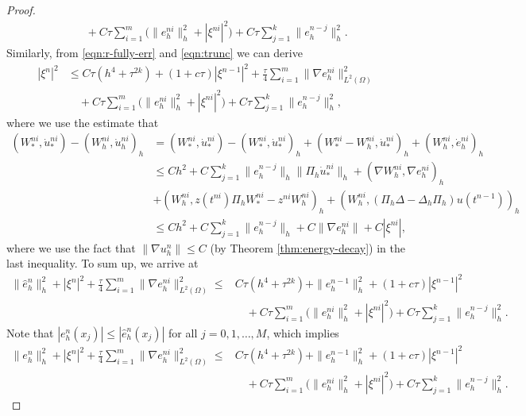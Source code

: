 \documentclass[a4paper, oneside]{book}
\def\II{(\Omega)}
\begin{document}
\begin{proof}
\begin{equation}
\begin{split}
&\quad + C \tau   \sum_{i=1}^m \Big(\|  e_h^{ni} \|_h^2+ |\xi^{ni}|^2 \Big)
+ C\tau  \sum_{j=1}^{k} \|  e_h^{n-j} \|_h^2.
\end{split}
\end{equation}
Similarly, from \eqref{eqn:r-fully-err} and \eqref{eqn:trunc} we can derive
\begin{equation*}
\begin{split}
|\xi^n|^2 &\le C\tau(h^4+ \tau^{2k}) + (1+c \tau) |\xi^{n-1}|^2 + \frac \tau4 \sum_{i=1}^m \| \nabla e_h^{ni} \|_{L^2\II}^2 \\
&\quad + C \tau   \sum_{i=1}^m \Big(\|  e_h^{ni} \|_h^2+ |\xi^{ni}|^2 \Big)
+ C\tau  \sum_{j=1}^{k} \|  e_h^{n-j} \|_h^2,
\end{split}
\end{equation*}
where we use the estimate that
\begin{align*}
  (W_*^{ni} ,   \dot u_*^{ni}) -  (W_h^{ni} ,   \dot u_h^{ni})_h &=  (W_*^{ni} ,   \dot u_*^{ni})  -  (W_*^{ni} ,   \dot u_*^{ni}) _h
   + (W_*^{ni}-W_h^{ni},  \dot u_*^{ni})_h + (W_h^{ni},  \dot e_h^{ni} )_h \\
  & \le C h^{2} + C\sum_{j=1}^k \|  e_h^{n-j} \|_h \|  \Pi_h \dot u_*^{ni} \|_h + (\nabla W_h^{ni},  \nabla  e_h^{ni} )_h\\
 &+ ( W_h^{ni}, z(t^{ni}) \Pi_h W_*^{ni} - z^{ni} W_h^{ni} )_h
  +  ( W_h^{ni}, (\Pi_h \Delta - \Delta_h \Pi_h) u(t^{n-1}) )_h \\
 & \le C h^{2} + C\sum_{j=1}^k \|  e_h^{n-j} \|_h + C \| \nabla  e_h^{ni} \|  + C|\xi^{ni}|,
\end{align*}
where we use the fact that $ \| \nabla u_h^{n} \|\le C$ (by Theorem \ref{thm:energy-decay}) in the last inequality. To sum up, we arrive at
\begin{equation*}
\begin{split}
 \|\hat e_h^{n}\|_h^2 + |\xi^n|^2 + \frac\tau4 \sum_{i=1}^m \| \nabla e_h^{ni} \|_{L^2\II}^2
 \le&  C\tau(h^4+ \tau^{2k}) +  \|e_h^{n-1}\|_h^2 + (1+c \tau) |\xi^{n-1}|^2   \\
&\quad + C \tau   \sum_{i=1}^m \Big(\|  e_h^{ni} \|_h^2+ |\xi^{ni}|^2 \Big)
+ C\tau  \sum_{j=1}^{k} \|  e_h^{n-j} \|_h^2.
\end{split}
\end{equation*}
Note that $| e_h^{n}(x_j)| \le |\hat e_h^{n}(x_j)|$ for all $j=0,1,\ldots,M$, which implies
\begin{equation}\label{eqn:sav-est-02}
\begin{split}
 \|e_h^{n}\|_h^2 + |\xi^n|^2 + \frac\tau4 \sum_{i=1}^m \| \nabla e_h^{ni} \|_{L^2\II}^2
 \le&  C\tau(h^4+ \tau^{2k}) +  \|e_h^{n-1}\|_h^2 + (1+c \tau) |\xi^{n-1}|^2   \\
&\quad + C \tau   \sum_{i=1}^m \Big(\|  e_h^{ni} \|_h^2+ |\xi^{ni}|^2 \Big)
+ C\tau  \sum_{j=1}^{k} \|  e_h^{n-j} \|_h^2.
\end{split}
\end{equation}


\end{proof}
\end{document}
